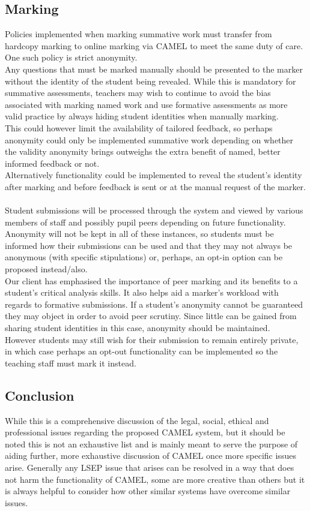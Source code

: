 \subsection*{Marking}
Policies implemented when marking summative work must transfer from hardcopy marking to online marking via CAMEL to meet the same duty of care. One such policy is strict anonymity.
\\Any questions that must be marked manually should be presented to the marker without the identity of the student being revealed. While this is mandatory for summative assessments, teachers may wish to continue to avoid the bias associated with marking named work and use formative assessments as more valid practice by always hiding student identities when manually marking.
\\This could however limit the availability of tailored feedback, so perhaps anonymity could only be implemented summative work depending on whether the validity anonymity brings outweighs the extra benefit of named, better informed feedback or not.
\\Alternatively functionality could be implemented to reveal the student's identity after marking and before feedback is sent or at the manual request of the marker.
\\\\Student submissions will be processed through the system and viewed by various members of staff and possibly pupil peers depending on future functionality. Anonymity will not be kept in all of these instances, so students must be informed how their submissions can be used and that they may not always be anonymous (with specific stipulations) or, perhaps, an opt-in option can be proposed instead/also.
\\Our client has emphasised the importance of peer marking and its benefits to a student's critical analysis skills. It also helps aid a marker's workload with regards to formative submissions. If a student's anonymity cannot be guaranteed they may object in order to avoid peer scrutiny. Since little can be gained from sharing student identities in this case, anonymity should be maintained.
\\However students may still wish for their submission to remain entirely private, in which case perhaps an opt-out functionality can be implemented so the teaching staff must mark it instead.
\subsection*{Conclusion}
While this is a comprehensive discussion of the legal, social, ethical and professional issues regarding the proposed CAMEL system, but it should be noted this is not an exhaustive list and is mainly meant to serve the purpose of aiding further, more exhaustive discussion of CAMEL once more specific issues arise. Generally any LSEP issue that arises can be resolved in a way that does not harm the functionality of CAMEL, some are more creative than others but it is always helpful to consider how other similar systems have overcome similar issues.
